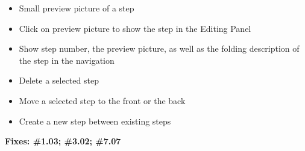 \begin{itemize}
\item Small preview picture of a step
\item Click on preview picture to show the step in the Editing Panel
\item Show step number, the preview picture, as well as the folding description of the step in the navigation
\item Delete a selected step
\item Move a selected step to the front or the back
\item Create a new step between existing steps
\end{itemize}

\textbf{Fixes: \#1.03; \#3.02;   \#7.07}
